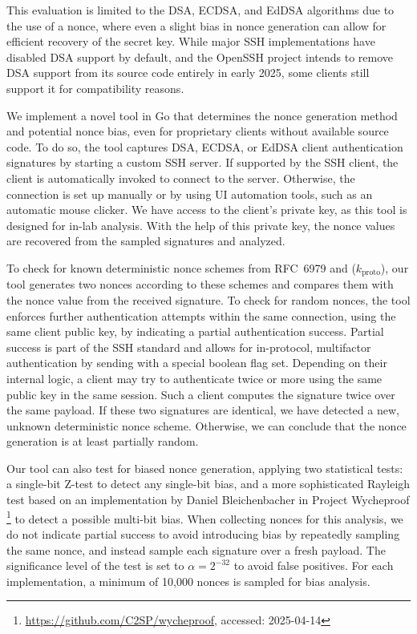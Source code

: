 This evaluation is limited to the DSA, ECDSA, and EdDSA algorithms due to the use of a nonce, where even a slight bias in nonce generation can allow for efficient recovery of the secret key. While major SSH implementations have disabled DSA support by default, and the OpenSSH project intends to remove DSA support from its source code entirely in early 2025, some clients still support it for compatibility reasons.

We implement a novel tool in Go that determines the nonce generation method and potential nonce bias, even for proprietary clients without available source code. To do so, the tool captures DSA, ECDSA, or EdDSA client authentication signatures by starting a custom SSH server. If supported by the SSH client, the client is automatically invoked to connect to the server. Otherwise, the connection is set up manually or by using UI automation tools, such as an automatic mouse clicker. We have access to the client's private key, as this tool is designed for in-lab analysis. With the help of this private key, the nonce values are recovered from the sampled signatures and analyzed.

To check for known deterministic nonce schemes from RFC~6979 and \putty \puttyvulnversion ($k_\text{proto}$), our tool generates two nonces according to these schemes and compares them with the nonce value from the received signature. To check for random nonces, the tool enforces further authentication attempts within the same connection, using the same client public key, by indicating a partial authentication success. Partial success is part of the SSH standard and allows for in-protocol, multifactor authentication by sending \msguserauthfailure with a special boolean flag set. Depending on their internal logic, a client may try to authenticate twice or more using the same public key in the same session. Such a client computes the signature twice over the same payload. If these two signatures are identical, we have detected a new, unknown deterministic nonce scheme. Otherwise, we can conclude that the nonce generation is at least partially random.

Our tool can also test for biased nonce generation, applying two statistical tests: a single-bit Z\nobreakdashes-test to detect any single-bit bias, and a more sophisticated Rayleigh test based on an implementation by Daniel Bleichenbacher in Project Wycheproof \footnote{\url{https://github.com/C2SP/wycheproof}, accessed: 2025-04-14} to detect a possible multi-bit bias.
When collecting nonces for this analysis, we do not indicate partial success to avoid introducing bias by repeatedly sampling the same nonce, and instead sample each signature over a fresh payload. The significance level of the test is set to $\alpha = 2^{-32}$ to avoid false positives. For each implementation, a minimum of 10,000 nonces is sampled for bias analysis.
